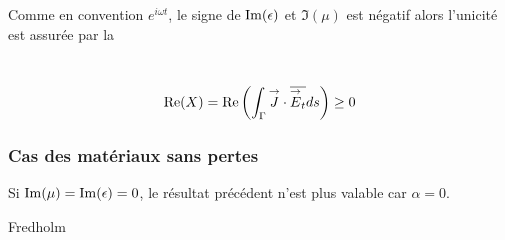   Comme en convention \(e^{i\omega t}\), le signe de \(\operatorname{Im}(\epsilon)\) et \(\Im(\mu)\) est négatif
  alors l'unicité est assurée par la
  \begin{defn}~\\
    \begin{equation}\label{eq:unicite:form_var:cgu}
      \operatorname{Re}(X) = \operatorname{Re}\left(\int_\Gamma {\overset{\rightarrow}{J}} \cdot {\overline{{\overset{\rightarrow}{E}}_t}} ds\right) \ge 0
    \end{equation}
  \end{defn}

\subsubsection{Cas des matériaux sans pertes}

  Si \(\operatorname{Im}(\mu) = \operatorname{Im}(\epsilon) = 0\), le résultat précédent n'est plus valable car \(\alpha = 0\).

  \begin{REF}
      Fredholm
  \end{REF}

